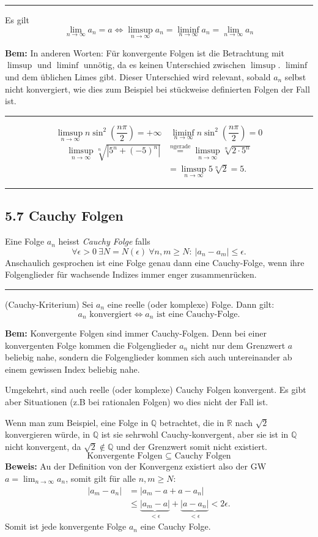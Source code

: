 \documentclass[a4paper,landscape,8pt]{extarticle}
\newcommand{\Q}{\mathbb{Q}}
\newcommand{\R}{\mathbb{R}}
\newcommand{\abs}[1]{\left\lvert #1 \right\rvert}
\newcommand{\sep}{\vspace{5pt}\noindent\hrule\vspace{5pt}}
\newcommand{\Bem}{\textbf{Bem: }}
\newcommand{\Beweis}{\textbf{Beweis: }}
\begin{document}
\begin{multicols*}{4}
\sep

\Satz Es gilt
\[
\lim_{n\to\infty} a_n = a \Longleftrightarrow \limsup_{n\to\infty} a_n =
\liminf_{n\to\infty} a_n = \lim_{n\to\infty} a_n
\]

\Bem In anderen Worten: Für konvergente Folgen ist die Betrachtung mit $\limsup$
und $\liminf$ unnötig, da es keinen Unterschied zwischen $\limsup$. $\liminf$
und dem üblichen Limes gibt. Dieser Unterschied wird relevant, sobald $a_n$
selbst nicht konvergiert, wie dies zum Beispiel bei stückweise definierten
Folgen der Fall ist.

\sep

\Bsp
\[
\limsup_{n\to\infty} n \sin^2\left(\frac{n\pi}{2}\right) = +\infty
\quad
\liminf_{n\to\infty} n \sin^2\left(\frac{n\pi}{2}\right) = 0
\]
\Bsp
\begin{align*}
\limsup_{n\to\infty} \sqrt[n]{\abs{5^n+(-5)^n}} &\stackrel{n \text{
gerade}}{=} \limsup_{n\to\infty} 
\sqrt[n]{2\cdot 5^n}\\ &= \limsup_{n\to\infty}  5 \sqrt[n]{2} = 5.
\end{align*}

\sep

\subsection{5.7 Cauchy Folgen}

\Def Eine Folge $a_n$ heisst \emph{Cauchy Folge} falls
\[
\forall\epsilon > 0 \ \exists N = N(\epsilon)\ \forall n,m\geq N : \ 
\abs{a_n-a_m}\leq \epsilon.
\]
Anschaulich gesprochen ist eine Folge genau dann eine Cauchy-Folge, wenn ihre
Folgenglieder für wachsende Indizes immer enger zusammenrücken.

\sep 

\Satz (Cauchy-Kriterium) Sei $a_n$ eine reelle (oder komplexe) Folge. Dann gilt:
\[
a_n \text{ konvergiert} \Longleftrightarrow a_n \text{ ist eine Cauchy-Folge}.
\]

\Bem Konvergente Folgen sind immer Cauchy-Folgen. Denn bei einer konvergenten
Folge kommen die Folgenglieder $a_n$ nicht nur dem Grenzwert $a$ beliebig nahe,
sondern die Folgenglieder kommen sich auch untereinander ab einem gewissen Index
beliebig nahe.

Umgekehrt, sind auch reelle (oder
komplexe) Cauchy Folgen konvergent. Es gibt aber Situationen (z.B bei
rationalen Folgen) wo dies nicht der Fall ist.

Wenn man zum Beispiel, eine Folge in $\Q$ betrachtet, die in $\R$ nach
$\sqrt{2}$ konvergieren würde, in $\Q$ ist sie sehrwohl Cauchy-konvergent, aber
sie ist in $\Q$ nicht konvergent, da $\sqrt{2}\not\in\Q$ und der Grenzwert somit
nicht existiert.
\[
\text{Konvergente Folgen } \subseteq \text{ Cauchy Folgen}
\]
\Beweis Au der Definition von der Konvergenz existiert also der GW
$a=\lim_{n\to\infty} a_n$, somit gilt für alle $n,m\geq N$:
\begin{align*}
\abs{a_m-a_n} &= \abs{a_m - a + a - a_n}
\\ &\leq
\underbrace{\abs{a_m-a}}_{<\epsilon}
+\underbrace{\abs{a-a_n}}_{<\epsilon} < 2\epsilon.
\end{align*}
Somit ist jede konvergente Folge $a_n$ eine Cauchy Folge.



\end{multicols*}
\end{document}
